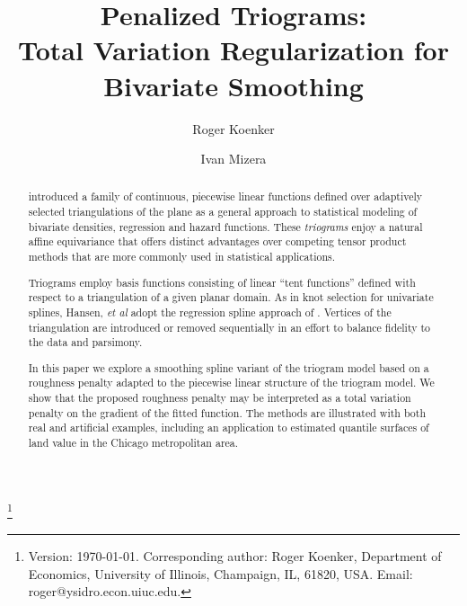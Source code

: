 






\title {\bf Penalized Triograms:\\  
Total Variation Regularization for Bivariate Smoothing}

\thanks{
Version: {\today}.
Corresponding author:  Roger Koenker, Department of Economics,
University of Illinois, Champaign, IL, 61820, USA. 
Email: roger@ysidro.econ.uiuc.edu.}



\author{Roger Koenker}
\address{University of Illinois at Urbana-Champaign }
\author{Ivan Mizera}
\address{University of Alberta }


\begin{abstract}
 introduced a family of continuous, 
piecewise linear functions defined over adaptively selected triangulations of 
the plane as a general approach to statistical modeling of bivariate 
densities, regression and hazard functions.  
These {\em triograms}
enjoy a natural affine equivariance that offers distinct
advantages over competing tensor product methods that are more  
commonly used in statistical applications.


Triograms employ basis functions consisting of linear
``tent functions'' defined with respect to a triangulation of a given
planar domain.  As in knot selection for univariate splines, 
Hansen, {\it et al} adopt the regression spline approach of 
. 
Vertices of the triangulation are introduced or removed sequentially in an 
effort to balance fidelity to the data and parsimony. 

In this paper we explore a smoothing spline variant of the 
triogram model based on a roughness penalty
adapted to the piecewise linear structure of the triogram model. 
We show that the proposed roughness penalty may be interpreted 
as a total variation penalty
on the gradient of the fitted function.  The methods are illustrated
with both real and artificial examples, including an application to
estimated quantile   surfaces of land value in the Chicago metropolitan area.

\end{abstract}

\maketitle

